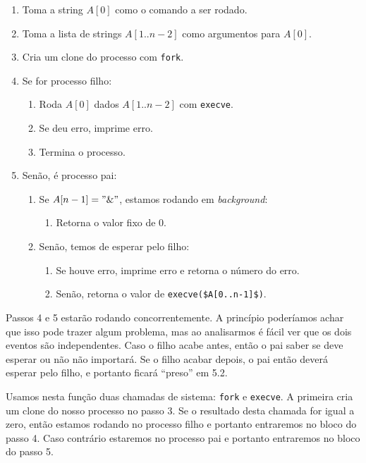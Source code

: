 \documentclass{amsart}
\theoremstyle{plain}
\newcommand{\code}[1]{\lstinline[mathescape=true]{#1}}
\newcommand{\mcode}[1]{\lstinline[mathescape]!#1!}
\begin{document}
\begin{enumerate}[label*=\arabic*.]
  \item Toma a string $A[0]$ como o comando a ser rodado.
  \item Toma a lista de strings $A[1..n-2]$ como argumentos para $A[0]$.
  \item Cria um clone do processo com \code{fork}.
  \item Se for processo filho:
  \begin{enumerate}[label*=\arabic*.]
    \item Roda $A[0]$ dados $A[1..n-2]$ com \code{execve}.
    \item Se deu erro, imprime erro.
    \item Termina o processo.
  \end{enumerate}
  \item Senão, é processo pai:
  \begin{enumerate}[label*=\arabic*.]
    \item Se $A[n-1] = "\&"$, estamos rodando em \textit{background}:
    \begin{enumerate}[label*=\arabic*.]
      \item Retorna o valor fixo de 0.
    \end{enumerate}
    \item Senão, temos de esperar pelo filho:
      \begin{enumerate}[label*=\arabic*.]
        \item Se houve erro, imprime erro e retorna o número do erro.
        \item Senão, retorna o valor de \mcode{execve($A[0..n-1]$)}.
      \end{enumerate}
  \end{enumerate}
\end{enumerate}

Passos 4 e 5 estarão rodando concorrentemente. A princípio poderíamos achar que isso pode trazer
algum problema, mas ao analisarmos é fácil ver que os dois eventos são independentes. Caso o filho
acabe antes, então o pai saber se deve esperar ou não não importará. Se o filho acabar depois, o
pai então deverá esperar pelo filho, e portanto ficará ``preso'' em 5.2.

Usamos nesta função duas chamadas de sistema: \code{fork} e \code{execve}. A primeira cria um clone
do nosso processo no passo 3. Se o resultado desta chamada for igual a zero, então estamos rodando
no processo filho e portanto entraremos no bloco do passo 4. Caso contrário estaremos no processo
pai e portanto entraremos no bloco do passo 5.
\end{document}
